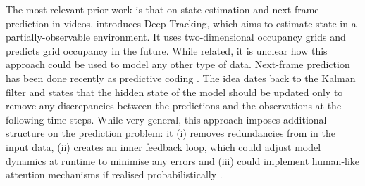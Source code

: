         The most relevant prior work is that on state estimation and next-frame prediction in videos. \cite{Ondruska2016} introduces Deep Tracking, which aims to estimate state in a partially-observable environment. It uses two-dimensional occupancy grids and predicts grid occupancy in the future. While related, it is unclear how this approach could be used to model any other type of data. Next-frame prediction has been done recently as predictive coding \citep{Lotter2016, Canziani2017}. The idea dates back to the Kalman filter \citep{Kalman1960} and states that the hidden state of the model should be updated only to remove any discrepancies between the predictions and the observations at the following time-steps. While very general, this approach imposes additional structure on the prediction problem: it (i) removes redundancies from in the input data, (ii) creates an inner feedback loop, which could adjust model dynamics at runtime to minimise any errors and (iii) could implement human-like attention mechanisms if realised probabilistically \citep{Friston2009guide}. 
    
  
%
%
